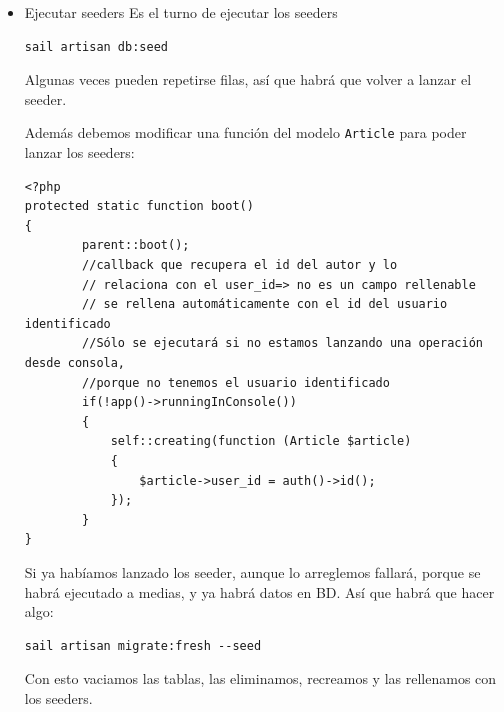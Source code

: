 \documentclass[11pt]{article}
\begin{document}
\begin{itemize}
\begin{verbatim}
class DatabaseSeeder extends Seeder
{
    /**
     * Seed the application's database.
     *
     * @return void
     */
    public function run()
    {
        //creamos un usuario con la User::factory
        //le pasamos datos, así que no usará lo del factory
        User::factory()->create([
            "name" => "CursosDesarrolloWeb",
            "email" => "laravel9@blogweb.es",
        ]);
        User::factory()->create([
            "name" => "Soporte",
            "email" => "soporte@blogweb.es",
        ]);
        //Para llamar al seeder sólo tenemos que llamarlo
        $this->call(CategorySeeder::class);
        //Creamos 20 artículos
        Article::factory(20)->create();
    }
}
\end{verbatim}

Nota:
\begin{mdframed}
No hemos mencionado la factoría de usuarios \texttt{UserFactory}, porque se
crea automáticamente al crear el proyecto Laravel, y no hemos
necesitado modificarla, sólo usarla. La puedes encontrar en
\texttt{database/factories/UserFactory.php}
\end{mdframed}


\item Ejecutar seeders
\label{sec:org9267dd7}
Es el turno de ejecutar los seeders
\begin{verbatim}
sail artisan db:seed
\end{verbatim}

Algunas veces pueden repetirse filas, así que habrá que volver a
lanzar el seeder.

Además debemos modificar una función del modelo \texttt{Article} para poder
lanzar los seeders:
\begin{verbatim}
<?php
protected static function boot()
{
        parent::boot();
        //callback que recupera el id del autor y lo
        // relaciona con el user_id=> no es un campo rellenable
        // se rellena automáticamente con el id del usuario identificado
        //Sólo se ejecutará si no estamos lanzando una operación desde consola,
        //porque no tenemos el usuario identificado
        if(!app()->runningInConsole())
        {
            self::creating(function (Article $article)
            {
                $article->user_id = auth()->id();
            });
        }
}
\end{verbatim}

Si ya habíamos lanzado los seeder, aunque lo arreglemos fallará,
porque se habrá ejecutado a medias, y ya habrá datos en BD. Así que
habrá que hacer algo:
\begin{verbatim}
sail artisan migrate:fresh --seed
\end{verbatim}

Con esto vaciamos las tablas, las eliminamos, recreamos y las
rellenamos con los seeders.
\end{itemize}
\end{document}
